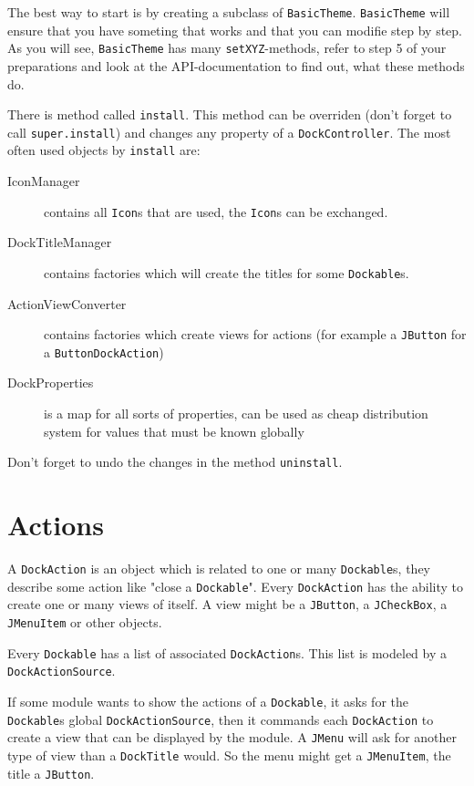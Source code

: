 \documentclass[a4paper,10pt]{article}
\newcommand{\src}[1]{\lstinline[basicstyle=\normalsize\ttfamily,keywordstyle=\normalsize\ttfamily,identifierstyle=\normalsize\ttfamily]|#1|}
\begin{document}
The best way to start is by creating a subclass of \src{BasicTheme}. \src{BasicTheme} will ensure that you have someting that works and that you can modifie step by step. As you will see, \src{BasicTheme} has many \src{setXYZ}-methods, refer to step 5 of your preparations and look at the API-documentation to find out, what these methods do.

There is method called \src{install}. This method can be overriden (don't forget to call \src{super.install}) and changes any property of a \src{DockController}. The most often used objects by \src{install} are:
\begin{description}
 \item[IconManager] contains all \src{Icon}s that are used, the \src{Icon}s can be exchanged.
 \item[DockTitleManager] contains factories which will create the titles for some \src{Dockable}s.
 \item[ActionViewConverter] contains factories which create views for actions (for example a \src{JButton} for a \src{ButtonDockAction})
 \item[DockProperties] is a map for all sorts of properties, can be used as cheap distribution system for values that must be known globally
\end{description}

Don't forget to undo the changes in the method \src{uninstall}.

\section{Actions}
A \src{DockAction} is an object which is related to one or many \src{Dockable}s, they describe some action like "close a \src{Dockable}". Every \src{DockAction} has the ability to create one or many views of itself. A view might be a \src{JButton}, a \src{JCheckBox}, a \src{JMenuItem} or other objects.

Every \src{Dockable} has a list of associated \src{DockAction}s. This list is modeled by a \src{DockActionSource}. 

If some module wants to show the actions of a \src{Dockable}, it asks for the \src{Dockable}s global \src{DockActionSource}, then it commands each \src{DockAction} to create a view that can be displayed by the module. A \src{JMenu} will ask for another type of view than a \src{DockTitle} would. So the menu might get a \src{JMenuItem}, the title a \src{JButton}.
\end{document}
